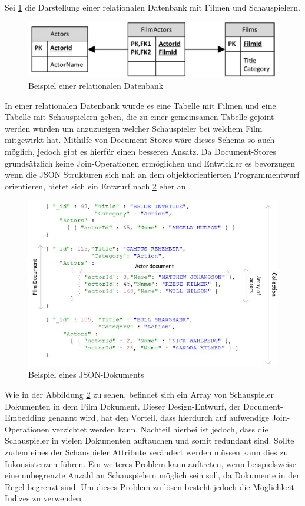 Sei \ref{fig:doc2} die Darstellung einer relationalen Datenbank mit Filmen und Schauspielern.
\begin{figure}[H]
	\centering
	\includegraphics[scale=0.4]{images/docstores_2.jpg} 
	\caption{Beispiel einer relationalen Datenbank}\label{fig:doc2}
\end{figure}
In einer relationalen Datenbank würde es eine Tabelle mit Filmen und eine Tabelle mit Schauspielern geben, die zu einer gemeinsamen Tabelle gejoint werden würden um anzuzueigen welcher Schauspieler bei welchem Film mitgewirkt hat. Mithilfe von Document-Stores wäre dieses Schema so auch möglich, jedoch gibt es hierfür einen besseren Ansatz. Da Document-Stores grundsätzlich keine Join-Operationen ermöglichen und Entwickler es bevorzugen wenn die JSON Strukturen sich nah an dem objektorientierten Programmentwurf orientieren, bietet sich ein Entwurf nach \ref{fig:doc1} eher an \cite{harrison01}.
\begin{figure}[H]
	\centering
	\includegraphics[scale=0.75]{images/docstores_1.jpg}
	\caption{Beispiel eines JSON-Dokuments}\label{fig:doc1}
\end{figure}
Wie in der Abbildung \ref{fig:doc1} zu sehen, befindet sich ein Array von Schauspieler Dokumenten in dem Film Dokument. Dieser Design-Entwurf, der Document-Embedding genannt wird, hat den Vorteil, dass hierdurch auf aufwendige Join-Operationen verzichtet werden kann. Nachteil hierbei ist jedoch, dass die Schauspieler in vielen Dokumenten auftauchen und somit redundant sind. Sollte zudem eines der Schauspieler Attribute verändert werden müssen kann dies zu Inkonsistenzen führen. Ein weiteres Problem kann auftreten, wenn beispielsweise eine unbegrenzte Anzahl an Schauspielern möglich sein soll, da Dokumente in der Regel begrenzt sind. Um dieses Problem zu lösen besteht jedoch die Möglichkeit Indizes zu verwenden \cite{harrison01}.
